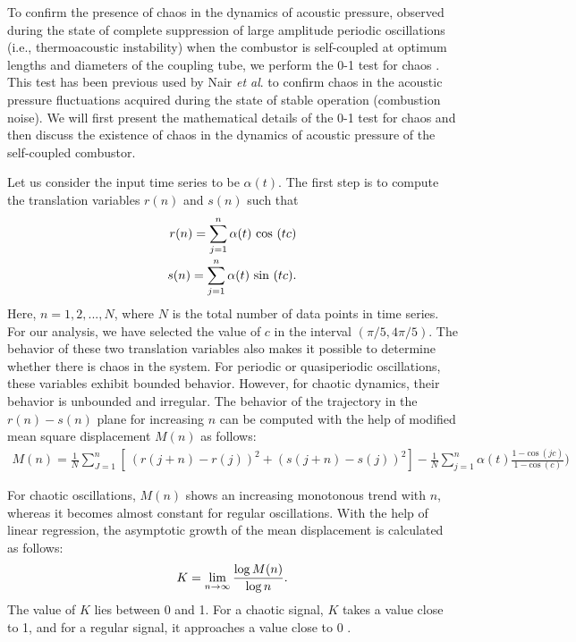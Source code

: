 \documentclass[onecolumn,12pt]{article} %
\begin{document}
To confirm the presence of chaos in the dynamics of acoustic pressure, observed during the state of complete suppression of large amplitude periodic oscillations (i.e., thermoacoustic instability) when the combustor is self-coupled at optimum lengths and diameters of the coupling tube, we perform the 0-1 test for chaos \cite{gottwald2004new}. This test has been previous used by Nair \textit{et al}. \cite{nair2013loss} to confirm chaos in the acoustic pressure fluctuations acquired during the state of stable operation (combustion noise). We will first present the mathematical details of the 0-1 test for chaos and then discuss the existence of chaos in the dynamics of acoustic pressure of the self-coupled combustor. 

Let us consider the input time series to be $\alpha(t)$. The first step is to compute the translation variables $r(n)$ and $s(n)$ such that \cite{gottwald2004new}
\begin{equation}
\begin{aligned}
    \textcolor{black}{r(n) = \sum_{j=1}^n \alpha(t) \ \text{cos} \ (tc)} \\[-1pt]
    \textcolor{black}{s(n) = \sum_{j=1}^n \alpha(t) \ \text{sin} \ (tc)}.
\end{aligned}
\end{equation}
Here, $n = 1,2,...,N$, where $N$ is the total number of data points in time series. For our analysis, we have selected the value of $c$ in the interval $(\pi/5, 4\pi/5)$\cite{nair2013loss}. The behavior of these two translation variables also makes it possible to determine whether there is chaos in the system. For periodic or quasiperiodic oscillations, these variables exhibit bounded behavior. However, for chaotic dynamics, their behavior is unbounded and irregular. The behavior of the trajectory in the $r(n)-s(n)$ plane for increasing $n$ can be computed with the help of modified mean square displacement $M(n)$ as follows:
\begin{equation}
\begin{aligned}
   M(n) = \frac{1}{N} \sum_{J=1}^n [\ (r(j+n)-r(j))^2+ (s(j+n)-s(j))^2] -\frac{1}{N}  \sum_{j=1}^n \alpha(t)  \frac{1- \text{cos} \ (jc)}{1-\text{cos} \ (c)})
\end{aligned}
\end{equation}

For chaotic oscillations, $M(n)$ shows an increasing monotonous trend with $n$, whereas it becomes almost constant for regular oscillations. With the help of linear regression, the asymptotic growth of the mean displacement is calculated as follows:
\begin{equation}
\centering
K = \lim_{n\to \infty} \frac{\log M(n)}{\log n}.
\end{equation}
The value of $K$ lies between 0 and 1. For a chaotic signal, $K$ takes a value close to 1, and for a regular signal, it approaches a value close to 0 \cite{gottwald2004new}. 
\end{document}
